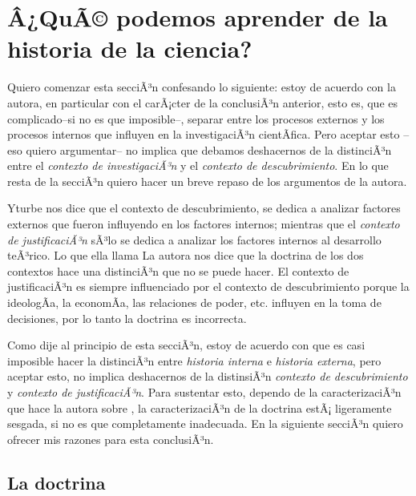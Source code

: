 \section{Â¿QuÃ© podemos aprender de la historia de la ciencia?}\label{sub:aprender}


\noindent Quiero comenzar esta secciÃ³n confesando lo siguiente: estoy de acuerdo con la autora, en particular con el carÃ¡cter de la conclusiÃ³n anterior, esto es, que es complicado--si no es que imposible--, separar entre los procesos externos y los procesos internos que influyen en la investigaciÃ³n cientÃ­fica.
Pero aceptar esto --eso quiero argumentar-- no implica que debamos deshacernos de la distinciÃ³n entre el \emph{contexto de investigaciÃ³n} y el \emph{contexto de descubrimiento}.
En lo que resta de la secciÃ³n quiero hacer un breve repaso de los argumentos de la autora.

Yturbe nos dice que el contexto de descubrimiento, se dedica a analizar factores externos que fueron influyendo en los factores internos; mientras que el \emph{contexto de justificaciÃ³n} sÃ³lo se dedica a analizar los factores internos al desarrollo teÃ³rico.
Lo que ella llama 
La autora nos dice que la doctrina de los dos contextos hace una distinciÃ³n que no se puede hacer.
El contexto de justificaciÃ³n es siempre influenciado por el contexto de descubrimiento porque la ideologÃ­a, la economÃ­a, las relaciones de poder, etc. influyen en la toma de decisiones, por lo tanto la doctrina es incorrecta.

Como dije al principio de esta secciÃ³n, estoy de acuerdo con que es casi imposible hacer la distinciÃ³n entre \emph{historia interna} e \emph{historia externa}, pero aceptar esto, no implica deshacernos de la distinsiÃ³n \emph{contexto de descubrimiento} y \emph{contexto de justificaciÃ³n}.
Para sustentar esto, dependo de la caracterizaciÃ³n que hace la autora sobre , la caracterizaciÃ³n de la doctrina estÃ¡ ligeramente sesgada, si no es que completamente inadecuada.
En la siguiente secciÃ³n quiero ofrecer mis razones para esta conclusiÃ³n.

\subsection{La doctrina}

